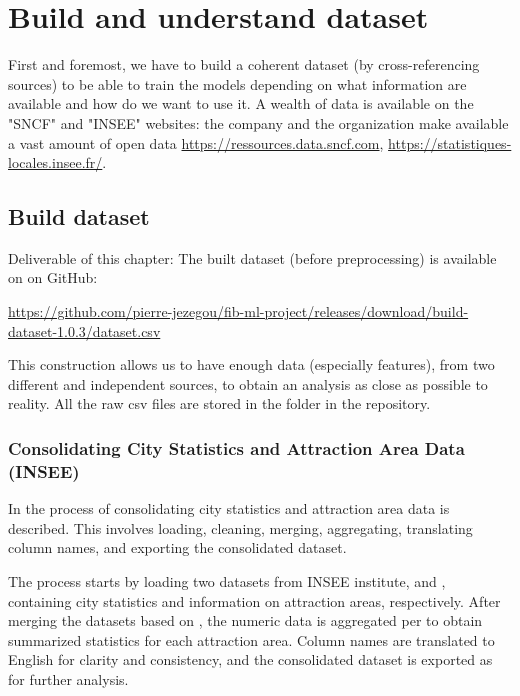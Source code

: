\chapter{Build and understand dataset}
First and foremost, we have to build a coherent dataset (by cross-referencing sources) to be able to train the models depending on what information are available and how do we want to use it. A wealth of data is available on the "SNCF" and "INSEE" websites: the company and the organization make available a vast amount of open data \url{https://ressources.data.sncf.com}, \url{https://statistiques-locales.insee.fr/}.

\section{Build dataset}
Deliverable of this chapter: The built dataset (before preprocessing) is available on on GitHub:
\begin{center}
    \url{https://github.com/pierre-jezegou/fib-ml-project/releases/download/build-dataset-1.0.3/dataset.csv}
\end{center}
This construction allows us to have enough data (especially features), from two different and independent sources, to obtain an analysis as close as possible to reality. All the raw csv files are stored in the  folder in the repository.

\subsection{Consolidating City Statistics and Attraction Area Data (INSEE)}
In \href{https://github.com/pierre-jezegou/fib-ml-project/blob/main/consolidate_cities.py}{} the process of consolidating city statistics and attraction area data is described. This involves loading, cleaning, merging, aggregating, translating column names, and exporting the consolidated dataset.

The process starts by loading two datasets from INSEE institute,  and , containing city statistics and information on attraction areas, respectively. After merging the datasets based on , the numeric data is aggregated per  to obtain summarized statistics for each attraction area. Column names are translated to English for clarity and consistency, and the consolidated dataset is exported as  for further analysis.

